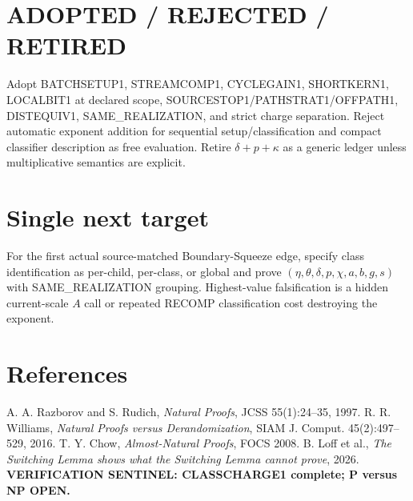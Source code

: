 \documentclass[11pt]{article}
\begin{document}
\section*{ADOPTED / REJECTED / RETIRED}
Adopt BATCHSETUP1, STREAMCOMP1, CYCLEGAIN1, SHORTKERN1, LOCALBIT1 at declared scope, SOURCESTOP1/PATHSTRAT1/OFFPATH1, DISTEQUIV1, SAME\_REALIZATION, and strict charge separation. Reject automatic exponent addition for sequential setup/classification and compact classifier description as free evaluation. Retire $\delta+p+\kappa$ as a generic ledger unless multiplicative semantics are explicit.
\section*{Single next target}
For the first actual source-matched Boundary-Squeeze edge, specify class identification as per-child, per-class, or global and prove $(\eta,\theta,\delta,p,\chi,a,b,g,s)$ with SAME\_REALIZATION grouping. Highest-value falsification is a hidden current-scale $A$ call or repeated RECOMP classification cost destroying the exponent.
\section*{References}
A. A. Razborov and S. Rudich, \emph{Natural Proofs}, JCSS 55(1):24--35, 1997. R. R. Williams, \emph{Natural Proofs versus Derandomization}, SIAM J. Comput. 45(2):497--529, 2016. T. Y. Chow, \emph{Almost-Natural Proofs}, FOCS 2008. B. Loff et al., \emph{The Switching Lemma shows what the Switching Lemma cannot prove}, 2026.
\bigskip\noindent\textbf{VERIFICATION SENTINEL: CLASSCHARGE1 complete; P versus NP OPEN.}
\end{document}
